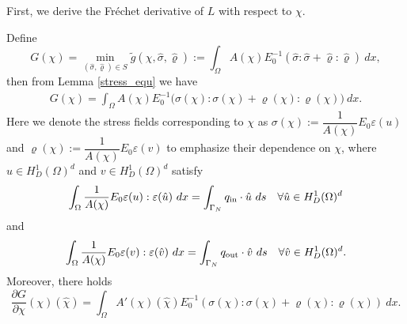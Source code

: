 \documentclass{amsart}
\begin{document}
First, we derive the Fréchet derivative of $ L $ with respect to $ \chi $.
\begin{lemma}\label{F-derivative}
    Define $$G(\chi) = \min_{(\hat\sigma,\hat\varrho)\in S} \tilde{g}(\chi,\hat\sigma,\hat\varrho):=\int_{\Omega}A(\chi)E_0^{-1}(\hat\sigma:\hat\sigma+\hat\varrho:\hat\varrho)\ dx,$$
    then from Lemma \ref{stress_equ} we have
    \begin{eqnarray}
        G(\chi) =\int_\Omega A(\chi)E_0^{-1}\big(\sigma(\chi):\sigma(\chi)+\varrho(\chi):\varrho(\chi)\big)\ dx.\nonumber
    \end{eqnarray}
    Here we denote the stress fields corresponding to \(\chi\) as \(\sigma(\chi):=\dfrac{1}{A(\chi)}{E}_0\varepsilon(u)\) and \(\varrho(\chi):=\dfrac{1}{A(\chi)}{E}_0\varepsilon(v)\) to emphasize their dependence on \(\chi\),
    where $ u\in H_D^1(\Omega)^d $ and $ v\in H_D^1(\Omega)^d $ satisfy
    \begin{eqnarray} \label{u_weak}
    \int_{\Omega}\dfrac{1}{A(\chi)}{E}_0\varepsilon(u):\varepsilon(\hat{u})\ dx=\int_{\Gamma_N}q_{\rm in}\cdot\hat{u}\ ds\quad\forall\hat{u}\in H_D^1(\Omega)^d
    \end{eqnarray}
    and 
    \begin{eqnarray} \label{v_weak}
    \int_{\Omega}\dfrac{1}{A(\chi)}{E}_0\varepsilon(v):\varepsilon(\hat{v})\ dx=\int_{\Gamma_N}q_{\rm out}\cdot\hat{v}\ ds\quad\forall\hat{v}\in H_D^1(\Omega)^d.
    \end{eqnarray}
    Moreover, there holds
    $$\dfrac{\partial G}{\partial \chi}(\chi)(\hat{\chi})=\int_{\Omega}A'(\chi)(\hat{\chi}){E}_0^{-1}(\sigma(\chi):\sigma(\chi)+\varrho(\chi):\varrho(\chi))\ dx.$$
\end{lemma}
\end{document}
